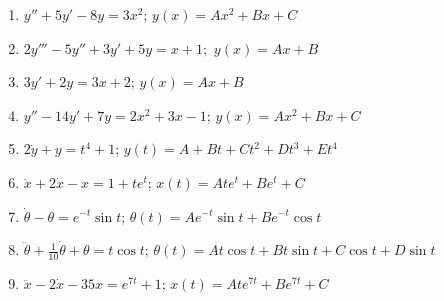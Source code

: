 \begin{enumerate}
\begin{enumerate}
\item  \hasasolution \label{exc:ode-taylor-14}$y''+5y'-8y=3x^{2}$; $y(x)=Ax^{2}+Bx+C$ 
\item $2y'''-5y''+3y'+5y=x+1;$ $y(x)=Ax+B$ 
\item  \hasananswer \label{exc:ode-taylor-15}$3y'+2y=3x+2$; $y(x)=Ax+B$
\item  \hasananswer \label{exc:ode-taylor-16}$y''-14y'+7y=2x^{2}+3x-1$;
$y(x)=Ax^{2}+Bx+C$ 
\item  \hasananswer \label{exc:ode-taylor-17}$2\dot{y}+y=t^{4}+1$; $y(t)=A+Bt+Ct^{2}+Dt^{3}+Et^{4}$
\item $\ddot{x}+2\dot{x}-x=1+te^{t}$; $x(t)=Ate^{t}+Be^{t}+C$ 
\item  \hasananswer \label{exc:ode-taylor-20}$\dot{\theta}-\theta=e^{-t}\sin t$;
$\theta(t)=Ae^{-t}\sin t+Be^{-t}\cos t$ 
\item  \hasasolution \label{exc:ode-taylor-18}$\ddot{\theta}+\frac{1}{10}\dot{\theta}+\theta=t\cos t$;
$\theta(t)=At\cos t+Bt\sin t+C\cos t+D\sin t$ 
\item  \hasananswer \label{exc:ode-taylor-19}$\ddot{x}-2\dot{x}-35x=e^{7t}+1$;
$x(t)=Ate^{7t}+Be^{7t}+C$ 
\end{enumerate}
\end{enumerate}

\noindent\finishexercises 

